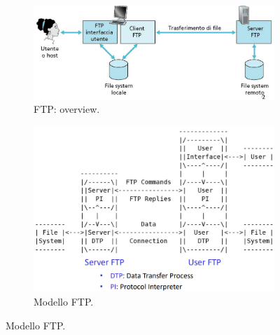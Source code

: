 \documentclass[11pt, italian, openany]{book}
\begin{document}
\begin{sloppypar}
\begin{itemize}[topsep=0pt]
	\begin{figure}[!h]
		\begin{subfigure}{0.49 \linewidth} \centering
			\includegraphics[scale=0.26]{images/ftp-overview.png}
			\caption{FTP: overview.}
		\end{subfigure}
		\begin{subfigure}{0.49 \linewidth} \centering
			\includegraphics[scale=0.25]{images/ftp-modello.png}
			\caption{Modello FTP.}
		\end{subfigure}
	\end{figure}


\end{itemize}
\end{sloppypar}
\end{document}
